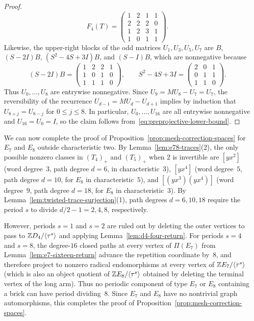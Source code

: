 \begin{proof}
\[  F_4(T)=\begin{pmatrix}1&2&1&1\\2&2&2&0\\1&2&3&1\\1&0&1&1\end{pmatrix}.
\]
Likewise, the upper-right blocks of the odd matrices $U_1,U_3,U_5,U_7$ are $B$, $(S-2I)B$, $(S^2-4S+3I)B$, and $(S-I)B$, which are nonnegative because
\[
  (S-2I)B=\begin{pmatrix}1&2&2&1\\1&0&1&0\\1&1&1&0\end{pmatrix},\qquad
  S^2-4S+3I=\begin{pmatrix}2&0&1\\0&1&1\\1&1&0\end{pmatrix}.
\]
Thus $U_0,\ldots,U_8$ are entrywise nonnegative. Since $U_9=MU_8-U_7=U_7$, the reversibility of the recurrence $U_{d-1}=MU_d-U_{d+1}$ implies by induction that $U_{8+j}=U_{8-j}$ for $0\leq j\leq8$. In particular, $U_0,\ldots,U_{16}$ are all entrywise nonnegative and $U_{16}=U_0=I$, so the claim follows from~\eqref{eq:preprojective-lower-bound}.
\end{proof}

We can now complete the proof of Proposition~\ref{prop:mesh-correction-spaces} for $E_7$ and $E_8$ outside characteristic two. By Lemma~\ref{lem:e78-traces}(2), the only possible nonzero classes in $(T_4)_+$ and $(T_5)_+$ when $2$ is invertible are $[yx^2]$ (word degree~$3$, path degree $d=6$, in characteristic~$3$), $[yx^4]$ (word degree~$5$, path degree $d=10$, for $E_8$ in characteristic~$5$), and $[(yx^3)(yx^4)]$ (word degree~$9$, path degree $d=18$, for $E_8$ in characteristic~$3$). By Lemma~\ref{lem:twisted-trace-surjection}(1), path degrees $d=6,10,18$ require the period $s$ to divide $d/2-1=2,4,8$, respectively.

However, periods $s=1$ and $s=2$ are ruled out by deleting the outer vertices to pass to $\mathbb Z D_4/\langle\tau^s\rangle$ and applying Lemma~\ref{lem:d4-four-return}. For periods $s=4$ and $s=8$, the degree-$16$ closed paths at every vertex of $\Pi(E_7)$ from Lemma~\ref{lem:e7-sixteen-return} advance the repetition coordinate by~$8$, and therefore project to nonzero radical endomorphisms at every vertex of $\mathbb Z E_7/\langle\tau^s\rangle$ (which is also an object quotient of $\mathbb Z E_8/\langle\tau^s\rangle$ obtained by deleting the terminal vertex of the long arm). Thus no periodic component of type $E_7$ or $E_8$ containing a brick can have period dividing~$8$. Since $E_7$ and $E_8$ have no nontrivial graph automorphisms, this completes the proof of Proposition~\ref{prop:mesh-correction-spaces}.
